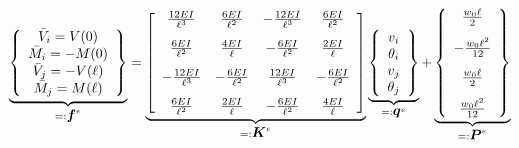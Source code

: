 \documentclass[11pt, oneside]{article}   	%
\newcommand{\vectr}[1]{\hbox{\boldmath$#1$}}
\begin{document}
\begin{equation}
   \underbrace{
   \left\{ 
   \begin{array}{c}
    \bar V_i = V(0) \\
    \bar M_i = -M(0) \\
    \bar V_j = -V(\ell) \\
    \bar M_j = M(\ell) 
   \end{array}
   \right\}
   }_{=:\vectr{f}^e}
   =
   \underbrace{
   \left[
   \begin{array}{cccc}
    \frac{12 {EI} }{\ell^3} & \frac{6 {EI} }{\ell^2} & -\frac{12 {EI} }{\ell^3} & \frac{6 {EI} }{\ell^2} \\[2ex]
    \frac{6 {EI}}{\ell^2} & \frac{4 {EI}}{\ell} & -\frac{6 {EI}}{\ell^2} & \frac{2 {EI}}{\ell} \\[2ex]
    -\frac{12 {EI} }{\ell^3} & -\frac{6 {EI} }{\ell^2} & \frac{12 {EI} }{\ell^3} & -\frac{6 {EI} }{\ell^2} \\[2ex]
    \frac{6 {EI}}{\ell^2} & \frac{2 {EI}}{\ell} &  -\frac{6 {EI}}{\ell^2}  &  \frac{4 {EI}}{\ell}
   \end{array}
   \right]
   }_{=:\vectr{K}^e}
   \underbrace{
   \left\{ 
   \begin{array}{c}
    v_i \\
    \theta_i \\
    v_j \\
    \theta_j 
   \end{array}
   \right\}
   }_{=:\vectr{q}^e}
   +
   \underbrace{
   \left\{ 
   \begin{array}{c}
    \frac{w_0 \ell}{2} \\[2ex]
    -\frac{w_0 \ell^2}{12}  \\[2ex]
    \frac{w_0 \ell}{2} \\[2ex]
    \frac{w_0 \ell^2}{12} 
   \end{array}
   \right\}
   }_{=:\vectr{P}^e}
   \label{C4}
\end{equation}
\begin{equation}
   \label{C5}
\end{equation}
\begin{equation}
   \label{C6}
\end{equation}
\begin{equation}
   \label{C7}
\end{equation}
\begin{equation}
   \label{C8}
\end{equation}
\begin{equation}
   \label{C9}
\end{equation}
\begin{equation}
   \label{C10}
\end{equation}
\end{document}
